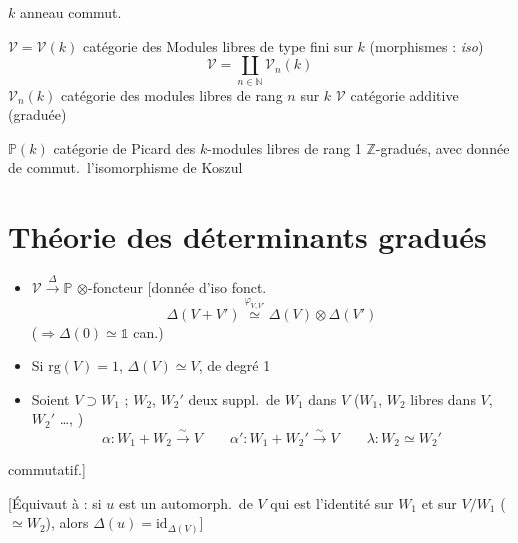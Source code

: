 \documentclass[11pt,a4paper]{article}
\begin{document}
$k$ anneau commut.

$\mathcal{V} = \mathcal{V}(k)$ catégorie des Modules libres de type fini sur
$k$ (morphismes : \emph{iso})
\[
\mathcal{V} = \coprod_{n \in \mathbb{N}} \mathcal{V}_n(k)
\]
$\mathcal{V}_n(k)$ catégorie des modules libres de rang $n$ sur $k$ \quad
$\mathcal{V}$ catégorie additive (graduée)


\struck{\ill{}} $\mathbb{P}(k)$ catégorie de Picard des $k$-modules libres de
rang 1 $\mathbb{Z}$-gradués, avec donnée de commut.\ l'isomorphisme de
Koszul

\section*{Théorie des déterminants gradués}


\begin{itemize}
  \item[a)] $\mathcal{V} \xrightarrow{\Delta} \mathbb{P}$ \quad
  $\otimes$-foncteur [donnée d'iso fonct.
  \[
  \Delta(V + V') \overset{\varphi_{V,V'}}{\simeq} \Delta(V) \otimes \Delta(V')
  \]
  ($\Rightarrow \Delta(0) \simeq \mathbb{1}$ can.)
  \item[b)] \struck{\ill{}} Si $\mathrm{rg}(V) = 1$, $\Delta(V) \simeq V$, de
  degré 1
  \item[c)] Soient $V \supset W_1$ ; $W_2$, $W_2'$ deux suppl.\ de $W_1$ dans
  $V$ ($W_1$, $W_2$ libres dans $V$, $W_2'$ …, )
  \[
  \alpha : W_1 + W_2 \xrightarrow{\sim} V \qquad
  \alpha' : W_1 + W_2' \xrightarrow{\sim} V \qquad
  \lambda : W_2 \simeq W_2'
  \]
\end{itemize}



commutatif.]

[Équivaut à : si $u$ est un automorph.\ de $V$ qui est l'identité sur $W_1$ et
sur $V/W_1$ ($\simeq W_2$), alors $\Delta(u) = \mathrm{id}_{\Delta(V)}$]
\end{document}
